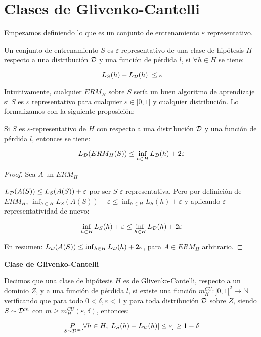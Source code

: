 \section{Clases de Glivenko-Cantelli}

Empezamos definiendo lo que es un conjunto de entrenamiento $\varepsilon$ representativo.

\begin{definition*}
 Un conjunto de entrenamiento $S$ es $\varepsilon$-representativo de una clase de hipótesis $H$ respecto a una
 distribución $\mathcal{D}$ y una función de pérdida $l$, si $\forall h\in H$ se tiene:
 
 \[|L_S(h) - L_{\mathcal{D}}(h)| \le \varepsilon\]
\end{definition*}

Intuitivamente, cualquier $ERM_H$ sobre $S$ sería un buen algoritmo de aprendizaje 
si $S$ es $\varepsilon$ representativo para cualquier $\varepsilon \in ]0,1[$ y cualquier distribución. 
Lo formalizamos con la siguiente proposición:

\begin{fact}
 Si $S$ es $\varepsilon$-representativo de $H$ con respecto a una distribución $\mathcal{D}$ y una función de 
 pérdida $l$, entonces se tiene:
 
 \[L_{\mathcal{D}}(ERM_H(S)) \le \inf_{h\in H} L_{\mathcal{D}}(h) + 2\varepsilon\]
 
 \label{fact:epsilon-rep}
\end{fact}

\begin{proof}
 Sea $A$ un $ERM_H$
 
 $L_{\mathcal{D}}(A(S)) \le L_S(A(S)) + \varepsilon$ por ser $S$ $\varepsilon$-representativa. Pero por definición de 
 $ERM_H$, $\inf_{h\in H} L_S(A(S)) + \varepsilon \le \inf_{h\in H}L_S(h) + \varepsilon$ y aplicando
 $\varepsilon$-representatividad de nuevo:
 
 \[\inf_{h\in H} L_S(h) + \varepsilon \le \inf_{h\in H} L_{\mathcal{D}}(h) + 2\varepsilon\]
 
 En resumen: $L_{\mathcal{D}}(A(S)) \le \inf_{h\in H} L_{\mathcal{D}}(h) + 2\varepsilon$, para $A \in ERM_H$ arbitrario.
\end{proof}


\begin{definition*} \textbf{Clase de Glivenko-Cantelli}

Decimos que una clase de hipótesis $H$ es de Glivenko-Cantelli, respecto a un dominio $Z$, y a 
una función de pérdida $l$, si existe una función ${m_{H}^{CU}: ]0,1[^2 \rightarrow \mathbb{N}}$ 
verificando que para todo $0 < \delta, \varepsilon < 1$ y para toda distribución $\mathcal{D}$ sobre $Z$, siendo 
$S\sim \mathcal{D}^m$ con $m \ge m_{H}^{CU}(\varepsilon, \delta)$, 
entonces:

\[\underset{S\sim \mathcal{D}^m}{P} [\forall h\in H, |L_S(h) - L_{\mathcal{D}}(h)| \le \varepsilon] \ge 1-\delta\]
\end{definition*}

